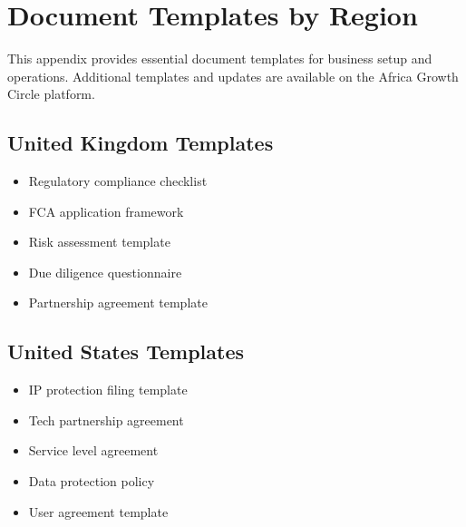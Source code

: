 
\chapter{Document Templates by Region}

\begin{importantbox}
This appendix provides essential document templates for business setup and operations. Additional templates and updates are available on the Africa Growth Circle platform.
\end{importantbox}

\section{United Kingdom Templates}
\begin{tcolorbox}[colback=white,colframe=primarydark,title=\textbf{Financial Services Documentation}]
\begin{itemize}
    \item Regulatory compliance checklist
    \item FCA application framework
    \item Risk assessment template
    \item Due diligence questionnaire
    \item Partnership agreement template
\end{itemize}
\end{tcolorbox}

\section{United States Templates}
\begin{tcolorbox}[colback=white,colframe=primarydark,title=\textbf{Tech Business Documentation}]
\begin{itemize}
    \item IP protection filing template
    \item Tech partnership agreement
    \item Service level agreement
    \item Data protection policy
    \item User agreement template
\end{itemize}
\end{tcolorbox}